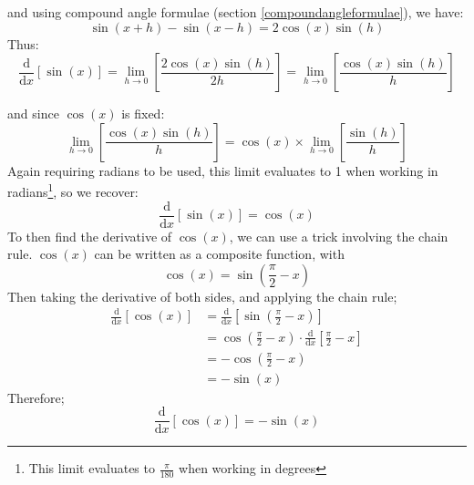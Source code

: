 \documentclass[11pt, a4paper]{article}
\begin{document}
and using compound angle formulae (section \ref{compoundangleformulae}), we have:
\begin{equation*}
\sin(x+h)-\sin(x-h)=2\cos(x)\sin(h)
\end{equation*}
Thus:
\begin{equation*}
\frac{\mathrm{d}}{\mathrm{d}x}\left[\sin(x)\right]=\lim_{h\to0}\left[\frac{2\cos(x)\sin(h)}{2h}\right]=\lim_{h\to0}\left[\frac{\cos(x)\sin(h)}{h}\right]
\end{equation*}
\begin{figure}[H]
\centering
{}
\end{figure}
and since $\cos(x)$ is fixed:
\begin{equation*}
\lim_{h\to0}\left[\frac{\cos(x)\sin(h)}{h} \right]=\cos(x)\times\lim_{h\to0}\left[ \frac{\sin(h)}{h}\right]
\end{equation*}
Again requiring radians to be used, this limit evaluates to 1 when working in radians\footnote{This limit evaluates to $\frac{\pi}{180}$ when working in degrees}, so we recover:
\begin{equation*}
\frac{\mathrm{d}}{\mathrm{d}x}\left[ \sin(x) \right]=\cos(x)
\end{equation*}
To then find the derivative of $\cos(x)$, we can use a trick involving the chain rule. $\cos(x)$ can be written as a composite function, with
\begin{equation*}
\cos(x)=\sin\left( \frac{\pi}{2}-x \right)
\end{equation*}
Then taking the derivative of both sides, and applying the chain rule;
\begin{align*}
\frac{\mathrm{d}}{\mathrm{d}x}\left[ \cos(x) \right] &= \frac{\mathrm{d}}{\mathrm{d}x}\left[ \sin\left( \frac{\pi}{2}-x \right) \right] \\
&=\cos\left( \frac{\pi}{2}-x \right)\cdot\frac{\mathrm{d}}{\mathrm{d}x}\left[ \frac{\pi}{2}-x \right] \\
&=-\cos\left( \frac{\pi}{2}-x \right) \\
&=-\sin(x)
\end{align*}
Therefore;
\begin{equation*}
\frac{\mathrm{d}}{\mathrm{d}x}\left[ \cos(x) \right]=-\sin(x)
\end{equation*}
\vspace{0.5cm}
\end{document}
